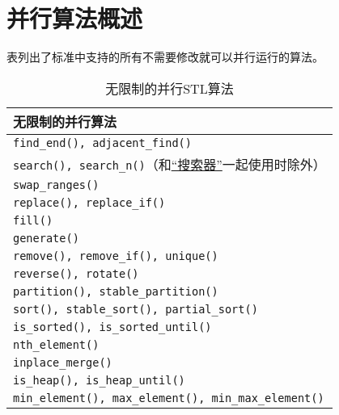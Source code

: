 \section{并行算法概述}
表列出了标准中支持的所有不需要修改就可以并行运行的算法。
\begin{table}[htb]
    \centering
    \begin{tabular}{l}
        \hline
        \textbf{无限制的并行算法}                                              \\
        \hline
        \texttt{find\_end(), adjacent\_find()}                         \\
        \texttt{search(), search\_n()}（和\hyperref[ch24]{“搜索器”}一起使用时除外） \\
        \texttt{swap\_ranges()}                                        \\
        \texttt{replace(), replace\_if()}                              \\
        \texttt{fill()}                                                \\
        \texttt{generate()}                                            \\
        \texttt{remove(), remove\_if(), unique()}                      \\
        \texttt{reverse(), rotate()}                                   \\
        \texttt{partition(), stable\_partition()}                      \\
        \texttt{sort(), stable\_sort(), partial\_sort()}               \\
        \texttt{is\_sorted(), is\_sorted\_until()}                     \\
        \texttt{nth\_element()}                                        \\
        \texttt{inplace\_merge()}                                      \\
        \texttt{is\_heap(), is\_heap\_until()}                         \\
        \texttt{min\_element(), max\_element(), min\_max\_element()}   \\
        \hline
    \end{tabular}
    \caption{无限制的并行STL算法}
    \label{t22.2}
\end{table}

